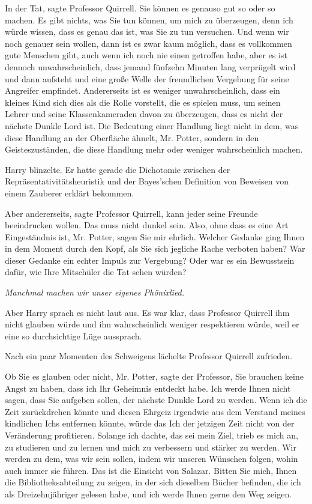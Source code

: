 \glqq In der Tat\grqq{}, sagte Professor Quirrell. \glqq Sie können es genauso
gut so oder so machen. Es gibt nichts, was Sie tun können, um mich zu
überzeugen, denn ich würde wissen, dass es genau das ist, was Sie zu tun
versuchen. Und wenn wir noch genauer sein wollen, dann ist es zwar kaum möglich,
dass es vollkommen gute Menschen gibt, auch wenn ich noch nie einen getroffen
habe, aber es ist dennoch unwahrscheinlich, dass jemand fünfzehn Minuten lang
verprügelt wird und dann aufsteht und eine große Welle der freundlichen
Vergebung für seine Angreifer empfindet. Andererseits ist es weniger
unwahrscheinlich, dass ein kleines Kind sich dies als die Rolle vorstellt, die
es spielen muss, um seinen Lehrer und seine Klassenkameraden davon zu
überzeugen, dass es nicht der nächste Dunkle Lord ist. Die Bedeutung einer
Handlung liegt nicht in dem, was diese Handlung an der Oberfläche ähnelt, Mr.
Potter, sondern in den Geisteszuständen, die diese Handlung mehr oder weniger
wahrscheinlich machen.\grqq{}

Harry blinzelte. Er hatte gerade die Dichotomie zwischen der
Repräsentativitätsheuristik und der Bayes'schen Definition von Beweisen von
einem Zauberer erklärt bekommen.

\glqq Aber andererseits\grqq{}, sagte Professor Quirrell, \glqq kann jeder
seine Freunde beeindrucken wollen. Das muss nicht dunkel sein. Also, ohne dass
es eine Art Eingeständnis ist, Mr. Potter, sagen Sie mir ehrlich. Welcher
Gedanke ging Ihnen in dem Moment durch den Kopf, als Sie sich jegliche Rache
verboten haben? War dieser Gedanke ein echter Impuls zur Vergebung? Oder war es
ein Bewusstsein dafür, wie Ihre Mitschüler die Tat sehen würden?\grqq{}

\emph{Manchmal machen wir unser eigenes Phönixlied.}

Aber Harry sprach es nicht laut aus. Es war klar, dass Professor Quirrell ihm
nicht glauben würde und ihn wahrscheinlich weniger respektieren würde, weil er
eine so durchsichtige Lüge aussprach.

Nach ein paar Momenten des Schweigens lächelte Professor Quirrell zufrieden.

\glqq Ob Sie es glauben oder nicht, Mr. Potter\grqq{}, sagte der Professor,
\glqq Sie brauchen keine Angst zu haben, dass ich Ihr Geheimnis entdeckt habe.
Ich werde Ihnen nicht sagen, dass Sie aufgeben sollen, der nächste Dunkle Lord
zu werden. Wenn ich die Zeit zurückdrehen könnte und diesen Ehrgeiz irgendwie
aus dem Verstand meines kindlichen Ichs entfernen könnte, würde das Ich der
jetzigen Zeit nicht von der Veränderung profitieren. Solange ich dachte, das sei
mein Ziel, trieb es mich an, zu studieren und zu lernen und mich zu verbessern
und stärker zu werden. Wir werden zu dem, was wir sein sollen, indem wir unseren
Wünschen folgen, wohin auch immer sie führen. Das ist die Einsicht von Salazar.
Bitten Sie mich, Ihnen die Bibliotheksabteilung zu zeigen, in der sich dieselben
Bücher befinden, die ich als Dreizehnjähriger gelesen habe, und ich werde Ihnen
gerne den Weg zeigen.\grqq{}

